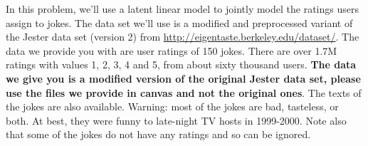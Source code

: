 \documentclass{harvardml}
\theoremstyle{plain}
\begin{document}
\begin{problem}
In this problem, we'll use a latent linear model to jointly model the ratings
users assign to jokes. The data set we'll use is a modified and preprocessed
variant of the Jester data set (version 2) from
\url{http://eigentaste.berkeley.edu/dataset/}. The data we provide you with are user
ratings of 150 jokes. There are over 1.7M ratings with values 1, 2, 3, 4 and 5,
from about sixty thousand users. {\bf The data we give you is a modified version of the original Jester data set,
please use the files we provide in canvas and not the original ones}. The texts of the jokes are also available.
Warning: most of the jokes are bad, tasteless, or both. At best, they were
funny to late-night TV hosts in 1999-2000. Note also that some of the jokes do
not have any ratings and so can be ignored.
\end{problem}
\end{document}
